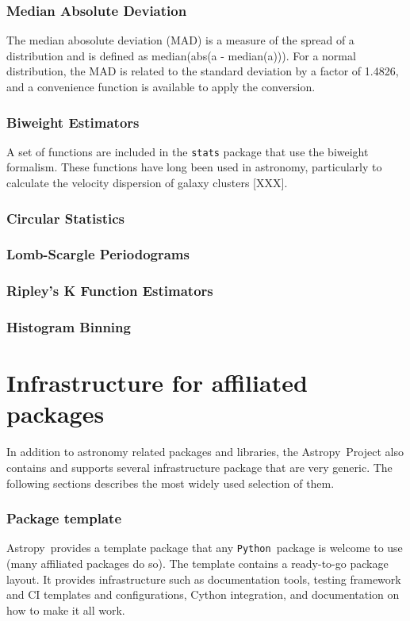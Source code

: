 \documentclass[modern]{aastex61}
\newcommand{\package}[1]{\texttt{#1}}
\newcommand{\python}{\package{Python}}
\newcommand{\astropy}{Astropy}
\begin{document}
\subsubsection{Median Absolute Deviation}

The median abosolute deviation (MAD) is a measure of the spread of a distribution and is defined as median(abs(a - median(a))). For a normal distribution, the MAD is related to the standard deviation by a factor of 1.4826, and a convenience function is available to apply the conversion.

\subsubsection{Biweight Estimators}

A set of functions are included in the \package{stats} package that use the biweight formalism. These functions have long been used in astronomy, particularly to calculate the velocity dispersion of galaxy clusters [XXX].

\subsubsection{Circular Statistics}
\subsubsection{Lomb-Scargle Periodograms}
\subsubsection{Ripley's K Function Estimators}
\subsubsection{Histogram Binning}

\section{Infrastructure for affiliated packages}
\label{sec:infrastructure}
%
\par In addition to astronomy related packages and libraries, the \astropy\
Project also contains and supports several infrastructure package that are
very generic. The following sections describes the most widely used
selection of them.
%
\subsubsection{Package template}
\par \astropy\ provides a template package that any \python\ package is welcome to
use (many affiliated packages do so). The template contains a ready-to-go
package layout. It provides infrastructure such as documentation tools,
testing framework and CI templates and configurations, Cython integration,
and documentation on how to make it all work.
%
\end{document}
